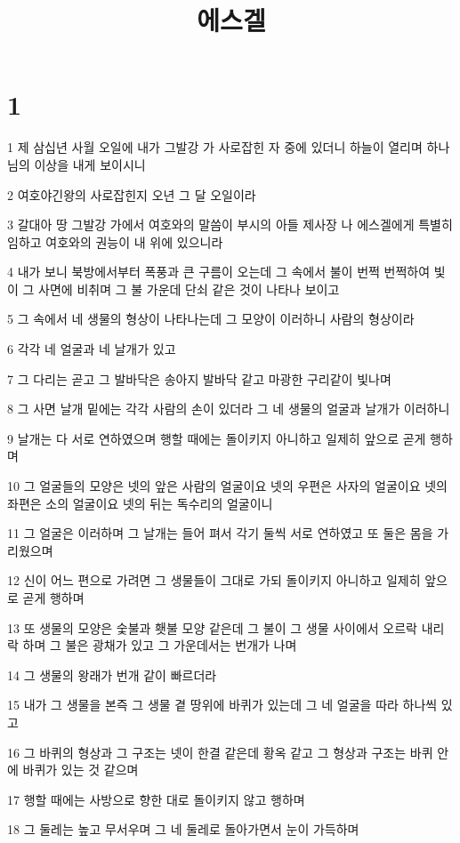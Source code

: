 

\title{에스겔}


\chapter{1}

\par 1 제 삼십년 사월 오일에 내가 그발강 가 사로잡힌 자 중에 있더니 하늘이 열리며 하나님의 이상을 내게 보이시니
\par 2 여호야긴왕의 사로잡힌지 오년 그 달 오일이라
\par 3 갈대아 땅 그발강 가에서 여호와의 말씀이 부시의 아들 제사장 나 에스겔에게 특별히 임하고 여호와의 권능이 내 위에 있으니라
\par 4 내가 보니 북방에서부터 폭풍과 큰 구름이 오는데 그 속에서 불이 번쩍 번쩍하여 빛이 그 사면에 비취며 그 불 가운데 단쇠 같은 것이 나타나 보이고
\par 5 그 속에서 네 생물의 형상이 나타나는데 그 모양이 이러하니 사람의 형상이라
\par 6 각각 네 얼굴과 네 날개가 있고
\par 7 그 다리는 곧고 그 발바닥은 송아지 발바닥 같고 마광한 구리같이 빛나며
\par 8 그 사면 날개 밑에는 각각 사람의 손이 있더라 그 네 생물의 얼굴과 날개가 이러하니
\par 9 날개는 다 서로 연하였으며 행할 때에는 돌이키지 아니하고 일제히 앞으로 곧게 행하며
\par 10 그 얼굴들의 모양은 넷의 앞은 사람의 얼굴이요 넷의 우편은 사자의 얼굴이요 넷의 좌편은 소의 얼굴이요 넷의 뒤는 독수리의 얼굴이니
\par 11 그 얼굴은 이러하며 그 날개는 들어 펴서 각기 둘씩 서로 연하였고 또 둘은 몸을 가리웠으며
\par 12 신이 어느 편으로 가려면 그 생물들이 그대로 가되 돌이키지 아니하고 일제히 앞으로 곧게 행하며
\par 13 또 생물의 모양은 숯불과 횃불 모양 같은데 그 불이 그 생물 사이에서 오르락 내리락 하며 그 불은 광채가 있고 그 가운데서는 번개가 나며
\par 14 그 생물의 왕래가 번개 같이 빠르더라
\par 15 내가 그 생물을 본즉 그 생물 곁 땅위에 바퀴가 있는데 그 네 얼굴을 따라 하나씩 있고
\par 16 그 바퀴의 형상과 그 구조는 넷이 한결 같은데 황옥 같고 그 형상과 구조는 바퀴 안에 바퀴가 있는 것 같으며
\par 17 행할 때에는 사방으로 향한 대로 돌이키지 않고 행하며
\par 18 그 둘레는 높고 무서우며 그 네 둘레로 돌아가면서 눈이 가득하며
